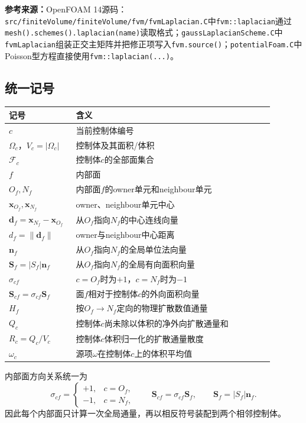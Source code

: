 \documentclass[UTF8,12pt,a4paper]{ctexart}
\numberwithin{equation}{section}
\newcommand{\source}[1]{%
  \par\smallskip
  \noindent\colorbox{sourcebg}{%
    \parbox{0.955\linewidth}{\footnotesize\color{sourcegray}\textbf{参考来源：}#1}%
  }
  \par\smallskip
}
\begin{document}
\source{OpenFOAM 14源码：\texttt{src/finiteVolume/finiteVolume/fvm/fvmLaplacian.C}中\texttt{fvm::laplacian}通过\texttt{mesh().schemes().laplacian(name)}读取格式；\texttt{gaussLaplacianScheme.C}中\texttt{fvmLaplacian}组装正交主矩阵并把修正项写入\texttt{fvm.source()}；\texttt{potentialFoam.C}中Poisson型方程直接使用\texttt{fvm::laplacian(...)}。}

\subsection*{统一记号}

\begin{longtable}{>{\centering\arraybackslash}p{0.20\linewidth}p{0.69\linewidth}}
\toprule
记号 & 含义\\
\midrule
$c$ & 当前控制体编号\\
$\Omega_c$，$V_c=|\Omega_c|$ & 控制体及其面积/体积\\
$\mathcal F_c$ & 控制体$c$的全部面集合\\
$f$ & 内部面\\
$O_f,N_f$ & 内部面$f$的owner单元和neighbour单元\\
$\bm x_{O_f},\bm x_{N_f}$ & owner、neighbour单元中心\\
$\bm d_f=\bm x_{N_f}-\bm x_{O_f}$ & 从$O_f$指向$N_f$的中心连线向量\\
$d_f=\lVert\bm d_f\rVert$ & owner与neighbour中心距离\\
$\bm n_f$ & 从$O_f$指向$N_f$的全局单位法向量\\
$\bm S_f=|S_f|\bm n_f$ & 从$O_f$指向$N_f$的全局有向面积向量\\
$\sigma_{cf}$ & $c=O_f$时为$+1$，$c=N_f$时为$-1$\\
$\bm S_{cf}=\sigma_{cf}\bm S_f$ & 面$f$相对于控制体$c$的外向面积向量\\
$H_f$ & 按$O_f\to N_f$定向的物理扩散数值通量\\
$Q_c$ & 控制体$c$尚未除以体积的净外向扩散通量和\\
$R_c=Q_c/V_c$ & 控制体$c$体积归一化的扩散通量散度\\
$\omega_c$ & 源项$\omega$在控制体$c$上的体积平均值\\
\bottomrule
\end{longtable}

内部面方向关系统一为
\begin{equation}
  \boxed{
  \sigma_{cf}=
  \begin{cases}
    +1,&c=O_f,\\
    -1,&c=N_f,
  \end{cases}
  \qquad
  \bm S_{cf}=\sigma_{cf}\bm S_f,
  \qquad
  \bm S_f=|S_f|\bm n_f.}
  \label{eq:orientation}
\end{equation}
因此每个内部面只计算一次全局通量，再以相反符号装配到两个相邻控制体。
\end{document}
